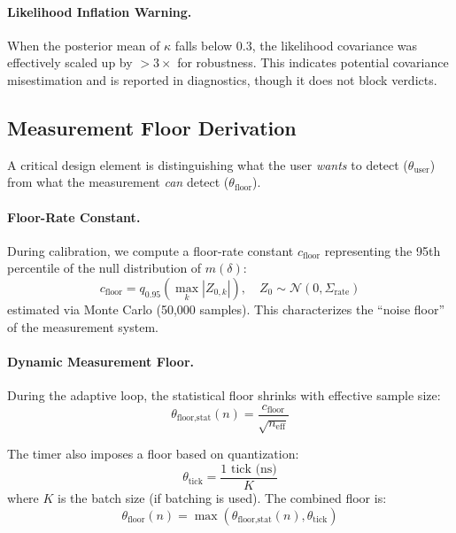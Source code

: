 \paragraph{Likelihood Inflation Warning.}
When the posterior mean of $\kappa$ falls below 0.3, the likelihood covariance was effectively scaled up by $>3\times$ for robustness. This indicates potential covariance misestimation and is reported in diagnostics, though it does not block verdicts.

\subsection{Measurement Floor Derivation}
\label{app:floor}

A critical design element is distinguishing what the user \emph{wants} to detect ($\theta_{\text{user}}$) from what the measurement \emph{can} detect ($\theta_{\text{floor}}$).

\paragraph{Floor-Rate Constant.}
During calibration, we compute a floor-rate constant $c_{\text{floor}}$ representing the 95th percentile of the null distribution of $m(\delta)$:
\begin{equation}
c_{\text{floor}} = q_{0.95}\!\left(\max_k |Z_{0,k}|\right), \quad Z_0 \sim \mathcal{N}(0, \Sigma_{\text{rate}})
\end{equation}
estimated via Monte Carlo (50,000 samples). This characterizes the ``noise floor'' of the measurement system.

\paragraph{Dynamic Measurement Floor.}
During the adaptive loop, the statistical floor shrinks with effective sample size:
\begin{equation}
\theta_{\text{floor,stat}}(n) = \frac{c_{\text{floor}}}{\sqrt{n_{\text{eff}}}}
\end{equation}

The timer also imposes a floor based on quantization:
\begin{equation}
\theta_{\text{tick}} = \frac{\text{1 tick (ns)}}{K}
\end{equation}
where $K$ is the batch size (if batching is used). The combined floor is:
\begin{equation}
\theta_{\text{floor}}(n) = \max\!\left(\theta_{\text{floor,stat}}(n), \theta_{\text{tick}}\right)
\end{equation}

